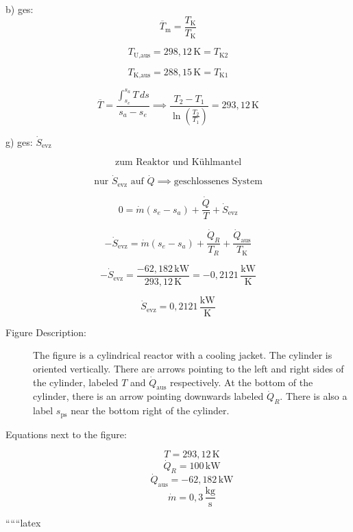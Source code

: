 b) ges:
\[
\overline{T}_{\text{m}} = \frac{T_{\text{K}}}{T_{\text{K}}}
\]

\[
T_{\text{U,aus}} = 298,12 \, \text{K} = T_{\text{K2}}
\]

\[
T_{\text{K,aus}} = 288,15 \, \text{K} = T_{\text{K1}}
\]

\[
\overline{T} = \frac{\int_{s_e}^{s_a} T \, ds}{s_a - s_e} \implies \frac{T_2 - T_1}{\ln \left( \frac{T_2}{T_1} \right)} = 293,12 \, \text{K}
\]

g) ges: $\dot{S}_{\text{evz}}$

\[
\text{zum Reaktor und Kühlmantel}
\]

\[
\text{nur } \dot{S}_{\text{evz}} \text{ auf } \dot{Q} \implies \text{geschlossenes System}
\]

\[
0 = \dot{m} (s_e - s_a) + \frac{\dot{Q}}{T} + \dot{S}_{\text{evz}}
\]

\[
-\dot{S}_{\text{evz}} = \dot{m} (s_e - s_a) + \frac{\dot{Q}_R}{T_R} + \frac{\dot{Q}_{\text{aus}}}{T_{\text{K}}}
\]

\[
-\dot{S}_{\text{evz}} = \frac{-62,182 \, \text{kW}}{293,12 \, \text{K}} = -0,2121 \, \frac{\text{kW}}{\text{K}}
\]

\[
\dot{S}_{\text{evz}} = 0,2121 \, \frac{\text{kW}}{\text{K}}
\]

\begin{description}
\item[Figure Description:] The figure is a cylindrical reactor with a cooling jacket. The cylinder is oriented vertically. There are arrows pointing to the left and right sides of the cylinder, labeled $T$ and $\dot{Q}_{\text{aus}}$ respectively. At the bottom of the cylinder, there is an arrow pointing downwards labeled $\dot{Q}_R$. There is also a label $s_{\text{ps}}$ near the bottom right of the cylinder.

\item[Equations next to the figure:]
\[
T = 293,12 \, \text{K}
\]
\[
\dot{Q}_R = 100 \, \text{kW}
\]
\[
\dot{Q}_{\text{aus}} = -62,182 \, \text{kW}
\]
\[
\dot{m} = 0,3 \, \frac{\text{kg}}{\text{s}}
\]
\end{description}

``````latex